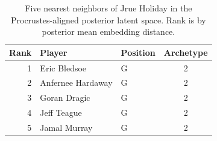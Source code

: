 \begin{table}[htbp]
  \centering\small
  \begin{tabular}{rllc}
    \toprule
    Rank & Player & Position & Archetype \\
    \midrule
    1 & Eric Bledsoe & G & 2 \\
    2 & Anfernee Hardaway & G & 2 \\
    3 & Goran Dragic & G & 2 \\
    4 & Jeff Teague & G & 2 \\
    5 & Jamal Murray & G & 2 \\
    \bottomrule
  \end{tabular}
  \caption{Five nearest neighbors of Jrue Holiday in the Procrustes-aligned posterior latent space. Rank is by posterior mean embedding distance.}
  \label{tab:Jrue_Holiday_neighbors}
\end{table}

